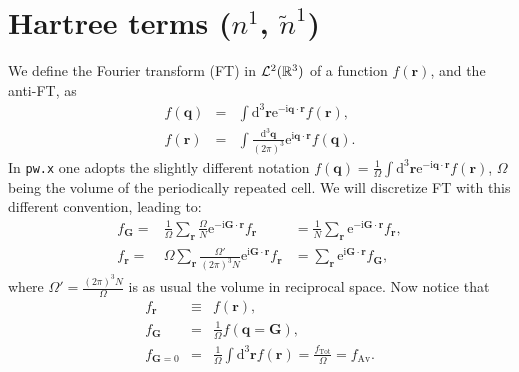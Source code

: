 \documentclass[a4paper,twocolumn,12pt]{article}
\newcommand{\var}[1]{{\tt #1}}
\begin{document}
\section*{Hartree terms ($n^1$, $\tilde{n}^1$)}

We define the Fourier transform (FT) in ${\cal{L}}^{2}(\mathbb{R}^3)$
of a function $f(\mathbf{r})$, and the anti-FT, as
\begin{eqnarray}
\label{eq:FTL2R3}
f(\mathbf{q}) &=& \int \mathrm{d}^3 \mathbf{r} \mathrm{e}^{ -\mathrm{i} \mathbf{q} \cdot \mathbf{r}} f(\mathbf{r}),\\
f(\mathbf{r}) &=& \int \frac{\mathrm{d}^3 \mathbf{q}}{(2\pi)^3} \mathrm{e}^{ \mathrm{i} \mathbf{q} \cdot \mathbf{r}} f(\mathbf{q}).
\end{eqnarray}
In \var{pw.x} one adopts the slightly different notation
$f(\mathbf{q})=\frac{1}{\Omega} \int \mathrm{d}^3 \mathbf{r}
\mathrm{e}^ { -\mathrm{i} \mathbf{q} \cdot \mathbf{r}} f(\mathbf{r})$,
$\Omega$ being the volume of the periodically repeated cell.
We will discretize FT with this different convention, leading to:
\begin{eqnarray}
\label{eq:discFT}f_\mathbf{G}=&\frac{1}{\Omega} \sum_\mathbf{r} \frac{\Omega}{N} \mathrm{e}^ { -\mathrm{i} \mathbf{G} \cdot \mathbf{r}} f_\mathbf{r}& =\frac{1}{N} \sum_\mathbf{r} \mathrm{e}^ { -\mathrm{i} \mathbf{G} \cdot \mathbf{r}} f_\mathbf{r},\\
f_\mathbf{r}=&{\Omega} \sum_\mathbf{r} \frac{\Omega'}{(2\pi)^3N} \mathrm{e}^ { \mathrm{i} \mathbf{G} \cdot \mathbf{r}} f_\mathbf{r}& = \sum_\mathbf{r} \mathrm{e}^ { \mathrm{i} \mathbf{G} \cdot \mathbf{r}} f_\mathbf{G},
\end{eqnarray}
where $\Omega'=\frac{(2\pi)^3N}{\Omega}$ is as usual the volume in
reciprocal space.  Now notice that
\begin{eqnarray}
f_\mathbf{r} &\equiv& f(\mathbf{r}),\\
f_\mathbf{G} &=& \frac{1}{\Omega} f(\mathbf{q}=\mathbf{G}),\\
f_{\mathbf{G}=0} &=& \frac{1}{\Omega} \int \mathrm{d}^3\mathbf{r} f(\mathbf{r})= \frac{f_\text{Tot}}{\Omega}=f_\text{Av}.
\end{eqnarray}
\end{document}
